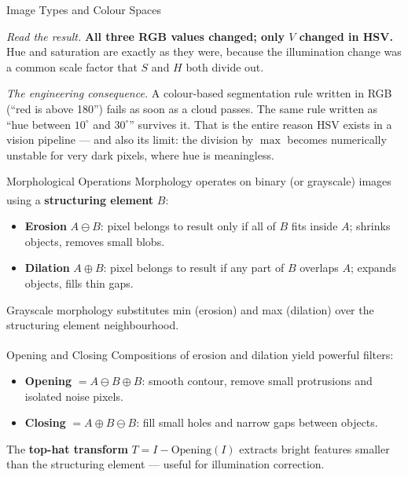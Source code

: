 \begin{v3topic}{Image Types and Colour Spaces}
\begin{workedexample}
\emph{Read the result.} \textbf{All three RGB values changed; only $V$
changed in HSV.} Hue and saturation are exactly as they were, because the
illumination change was a common scale factor that $S$ and $H$ both divide
out.

\emph{The engineering consequence.} A colour-based segmentation rule written
in RGB (``red is above 180'') fails as soon as a cloud passes. The same rule
written as ``hue between $10^\circ$ and $30^\circ$'' survives it. That is the
entire reason HSV exists in a vision pipeline --- and also its limit: the
division by $\max$ becomes numerically unstable for very dark pixels, where
hue is meaningless.
\end{workedexample}

\end{v3topic}
\begin{v3topic}{Morphological Operations}
    Morphology operates on binary (or grayscale) images using a \textbf{structuring element} $B$\textsuperscript{\cite[][pp.~627--636]{gonzalezWoods2018}}:
    \begin{itemize}
        \item \textbf{Erosion} $A \ominus B$: pixel belongs to result only if all of $B$ fits inside $A$; shrinks objects, removes small blobs.
        \item \textbf{Dilation} $A \oplus B$: pixel belongs to result if any part of $B$ overlaps $A$; expands objects, fills thin gaps.
    \end{itemize}
    Grayscale morphology substitutes min (erosion) and max (dilation) over the structuring element neighbourhood.

\end{v3topic}
\begin{v3topic}{Opening and Closing}
    Compositions of erosion and dilation yield powerful filters\textsuperscript{\cite[][pp.~638--645]{gonzalezWoods2018}}:
    \begin{itemize}
        \item \textbf{Opening} $= A \ominus B \oplus B$: smooth contour, remove small protrusions and isolated noise pixels.
        \item \textbf{Closing} $= A \oplus B \ominus B$: fill small holes and narrow gaps between objects.
    \end{itemize}
    The \textbf{top-hat transform} $T = I - \mathrm{Opening}(I)$ extracts bright features smaller than the structuring element — useful for illumination correction.
\end{v3topic}

